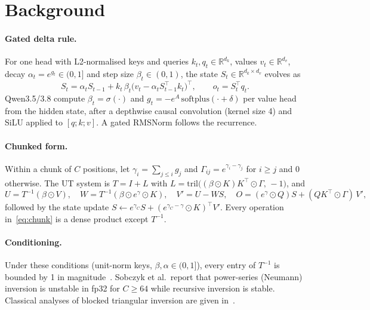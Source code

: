\documentclass[11pt]{article}
\theoremstyle{remark}
\begin{document}
\section{Background}\label{sec:bg}
\paragraph{Gated delta rule.} For one head with L2-normalised keys and queries $k_t,q_t\in\mathbb{R}^{d_k}$, values
$v_t\in\mathbb{R}^{d_v}$, decay $\alpha_t=e^{g_t}\in(0,1]$ and step size $\beta_t\in(0,1)$, the state
$S_t\in\mathbb{R}^{d_k\times d_v}$ evolves as
\begin{equation}
S_t = \alpha_t S_{t-1} + k_t\,\beta_t\big(v_t - \alpha_t S_{t-1}^{\top}k_t\big)^{\top}, \qquad o_t = S_t^{\top} q_t .
\label{eq:rec}
\end{equation}
Qwen3.5/3.8 compute $\beta_t=\sigma(\cdot)$ and $g_t=-e^{A}\,\mathrm{softplus}(\cdot+\delta)$ per value head from the hidden
state, after a depthwise causal convolution (kernel size 4) and SiLU applied to $[q;k;v]$. A gated RMSNorm follows the
recurrence.

\paragraph{Chunked form.} Within a chunk of $C$ positions, let $\gamma_i=\sum_{j\le i} g_j$ and
$\Gamma_{ij}=e^{\gamma_i-\gamma_j}$ for $i\ge j$ and 0 otherwise. The UT system is $T = I + L$ with
$L = \mathrm{tril}\big((\beta\odot K)K^{\top}\odot\Gamma,\,-1\big)$, and
\begin{equation}
U = T^{-1}(\beta\odot V), \quad W = T^{-1}(\beta\odot e^{\gamma}\odot K), \quad
V' = U - W S, \quad O = (e^{\gamma}\odot Q)S + (QK^{\top}\odot\Gamma)\,V',
\label{eq:chunk}
\end{equation}
followed by the state update $S \leftarrow e^{\gamma_C} S + (e^{\gamma_C-\gamma}\odot K)^{\top} V'$. Every operation
in~\eqref{eq:chunk} is a dense product except $T^{-1}$.

\paragraph{Conditioning.} Under these conditions (unit-norm keys, $\beta,\alpha\in(0,1]$), every entry of $T^{-1}$ is bounded
by 1 in magnitude~\cite{sobczyk2026tri}. Sobczyk et al.\ report that power-series (Neumann) inversion is unstable in fp32 for
$C\ge64$ while recursive inversion is stable. Classical analyses of blocked triangular inversion are given
in~\cite{ducroz1992,higham2002}.
\end{document}
